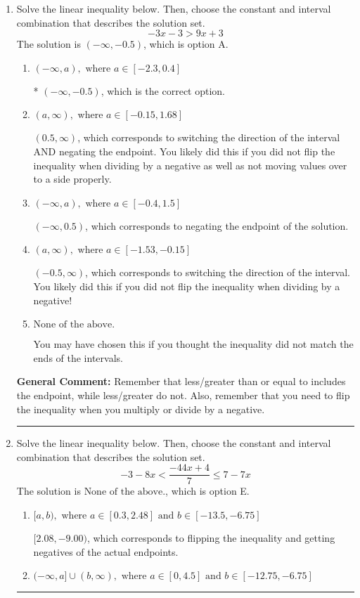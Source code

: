 \documentclass{extbook}[14pt]
\newcommand{\litem}[1]{\item #1

\rule{\textwidth}{0.4pt}}
\begin{document}
\begin{enumerate}\litem{
Solve the linear inequality below. Then, choose the constant and interval combination that describes the solution set.
\[ -3x -3 > 9x + 3 \]The solution is \( (-\infty, -0.5) \), which is option A.\begin{enumerate}[label=\Alph*.]
\item \( (-\infty, a), \text{ where } a \in [-2.3, 0.4] \)

* $(-\infty, -0.5)$, which is the correct option.
\item \( (a, \infty), \text{ where } a \in [-0.15, 1.68] \)

 $(0.5, \infty)$, which corresponds to switching the direction of the interval AND negating the endpoint. You likely did this if you did not flip the inequality when dividing by a negative as well as not moving values over to a side properly.
\item \( (-\infty, a), \text{ where } a \in [-0.4, 1.5] \)

 $(-\infty, 0.5)$, which corresponds to negating the endpoint of the solution.
\item \( (a, \infty), \text{ where } a \in [-1.53, -0.15] \)

 $(-0.5, \infty)$, which corresponds to switching the direction of the interval. You likely did this if you did not flip the inequality when dividing by a negative!
\item \( \text{None of the above}. \)

You may have chosen this if you thought the inequality did not match the ends of the intervals.
\end{enumerate}

\textbf{General Comment:} Remember that less/greater than or equal to includes the endpoint, while less/greater do not. Also, remember that you need to flip the inequality when you multiply or divide by a negative.
}
\litem{
Solve the linear inequality below. Then, choose the constant and interval combination that describes the solution set.
\[ -3 - 8 x < \frac{-44 x + 4}{7} \leq 7 - 7 x \]The solution is \( \text{None of the above.} \), which is option E.\begin{enumerate}[label=\Alph*.]
\item \( [a, b), \text{ where } a \in [0.3, 2.48] \text{ and } b \in [-13.5, -6.75] \)

$[2.08, -9.00)$, which corresponds to flipping the inequality and getting negatives of the actual endpoints.
\item \( (-\infty, a] \cup (b, \infty), \text{ where } a \in [0, 4.5] \text{ and } b \in [-12.75, -6.75] \)


\end{enumerate}}
\end{enumerate}
\end{document}
